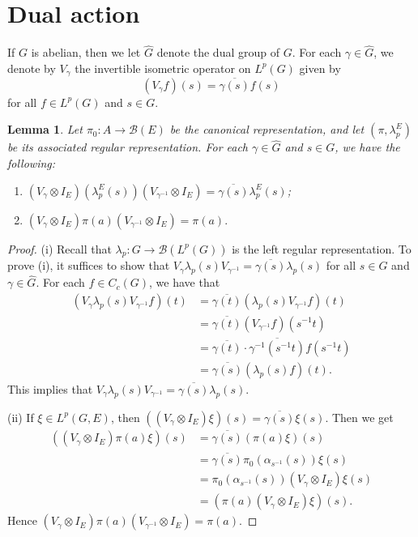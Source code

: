 \documentclass[reqno,11pt]{amsart}
\theoremstyle{plain}
\newtheorem{lem}[thm]{Lemma}
\theoremstyle{definition}
\theoremstyle{remark}
\begin{document}
\section{Dual action}\label{dual}
If $G$ is abelian, then we let $\hat{G}$ denote the dual group of $G$. For each $\gamma\in \hat{G}$, we denote by $V_\gamma$ the invertible isometric operator on $L^p(G)$ given by $$(V_\gamma f)(s)=\overline{\gamma(s)}f(s)$$ for all $f\in L^p(G)$ and $s\in G$.

\begin{lem}\label{dual1}
Let $\pi_0:A\rightarrow \mathcal{B}(E)$ be the canonical representation, and let $(\pi,\lambda_p^E)$ be its associated regular representation.
For each $\gamma\in \hat{G}$ and $s\in G$,
we have the following:
\begin{enumerate}
\item [(i)] $\left(V_\gamma\otimes I_E\right)\left(\lambda_p^E(s)\right)\left( V_{\gamma^{-1}}\otimes I_E\right)=\overline{\gamma(s)}\lambda_p^E(s)$;
\item [(ii)] $(V_\gamma\otimes I_E)\pi(a)(V_{\gamma^{-1}}\otimes I_E)=\pi(a).$
\end{enumerate}
\end{lem}
\begin{proof}
(i)
Recall that $\lambda_p:G\rightarrow \mathcal{B}(L^p(G))$ is the left regular representation.
To prove (i), it suffices to show that $V_\gamma\lambda_p(s)V_{\gamma^{-1}}=\overline{\gamma(s)}\lambda_p(s)$ for all $s\in G$ and $\gamma\in\hat{G}.$
For each $f\in C_c(G)$, we have that
$$\begin{aligned} \left(V_\gamma\lambda_p(s)V_{\gamma^{-1}}f\right)(t) &=
 \overline{\gamma(t)}\left(\lambda_p(s)V_{\gamma^{-1}}f\right)(t)
  \\ &=\overline{\gamma(t)}\left(V_{\gamma^{-1}}f\right)(s^{-1}t)
  \\ &=\overline{\gamma(t)}\cdot \overline{\gamma^{-1}(s^{-1}t)}f(s^{-1}t)
   \\ &=\overline{\gamma(s)}\left(\lambda_p(s)f\right)(t).\end{aligned}$$
This implies that $V_\gamma\lambda_p(s)V_{\gamma^{-1}}=\overline{\gamma(s)}\lambda_p(s)$.

(ii) If $\xi\in L^p(G,E)$, then $\left((V_\gamma\otimes I_E)\xi\right)(s)=\overline{\gamma(s)}\xi(s)$.
Then we get
$$\begin{aligned} \left((V_\gamma\otimes I_E)\pi(a)\xi\right)(s) &=
\overline{\gamma(s)}\left(\pi(a)\xi\right)(s)
  \\ &=\overline{\gamma(s)}\pi_0(\alpha_{s^{-1}}(s))\xi(s)
  \\ &=\pi_0(\alpha_{s^{-1}}(s)) (V_\gamma\otimes I_E)\xi(s)
   \\ &=\left(\pi(a)(V_\gamma\otimes I_E)\xi\right)(s).\end{aligned}$$
Hence $(V_\gamma\otimes I_E)\pi(a)(V_{\gamma^{-1}}\otimes I_E)=\pi(a).$
\end{proof}
\end{document}
